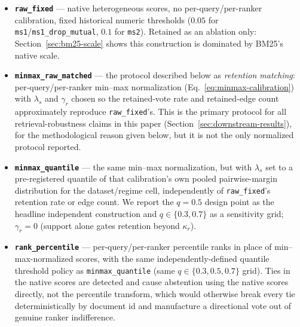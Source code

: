 \documentclass[manuscript,anonymous,review]{acmart}
\begin{document}
\begin{itemize}
  \item \textbf{\texttt{raw\_fixed}} --- native heterogeneous scores, no
    per-query/per-ranker calibration, fixed historical numeric thresholds
    ($0.05$ for \texttt{ms1}/\texttt{ms1\_drop\_mutual}, $0.1$ for
    \texttt{ms2}). Retained as an ablation only: Section~\ref{sec:bm25-scale}
    shows this construction is dominated by BM25's native scale.
  \item \textbf{\texttt{minmax\_raw\_matched}} --- the protocol described
    below as \emph{retention matching}: per-query/per-ranker min--max
    normalization (Eq.~\ref{eq:minmax-calibration}) with $\lambda_s$ and
    $\gamma_r$ chosen so the retained-vote rate and retained-edge count
    approximately reproduce \texttt{raw\_fixed}'s. This is the primary
    protocol for all retrieval-robustness claims in this paper
    (Section~\ref{sec:downstream-results}), for the methodological reason
    given below, but it is not the only normalized protocol reported.
  \item \textbf{\texttt{minmax\_quantile}} --- the same min--max
    normalization, but with $\lambda_s$ set to a pre-registered quantile of
    that calibration's own pooled pairwise-margin distribution for the
    dataset/regime cell, independently of \texttt{raw\_fixed}'s retention
    rate or edge count. We report the $q=0.5$ design point as the headline
    independent construction and $q\in\{0.3,0.7\}$ as a sensitivity grid;
    $\gamma_r=0$ (support alone gates retention beyond $\kappa_r$).
  \item \textbf{\texttt{rank\_percentile}} --- per-query/per-ranker
    percentile ranks in place of min--max-normalized scores, with the same
    independently-defined quantile threshold policy as
    \texttt{minmax\_quantile} (same $q\in\{0.3,0.5,0.7\}$ grid). Ties in the
    native scores are detected and cause abstention using the native scores
    directly, not the percentile transform, which would otherwise break
    every tie deterministically by document id and manufacture a directional
    vote out of genuine ranker indifference.
\end{itemize}
\end{document}
